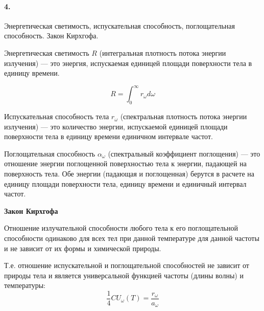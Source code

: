 


	
	\paragraph{4.}
	Энергетическая светимость, испускательная способность, поглощательная способность. Закон Кирхгофа.
	
	\begin{definition}
		Энергетическая светимость $R$ (интегральная плотность потока энергии излучения) — это энергия, испускаемая единицей площади поверхности тела в единицу времени.
		
		$$R = \int_{0}^{\infty} r_\omega d\omega$$
	\end{definition}
	
	\begin{definition}
		Испускательная способность тела $r_\omega$ (спектральная плотность потока энергии излучения) — это количество энергии, испускаемой единицей площади поверхности тела в единицу времени единичном интервале частот.
	\end{definition}
	
	\begin{definition}
		Поглощательная способность $α_ω$  (спектральный коэффициент поглощения) — это отношение энергии поглощенной поверхностью тела к энергии, падающей на поверхность тела. Обе энергии (падающая и поглощенная) берутся в расчете на единицу площади поверхности тела, единицу времени и единичный интервал частот.
	\end{definition}
	
	\textbf{Закон Кирхгофа}
	\begin{statement}
		Отношение излучательной способности любого тела к его поглощательной способности одинаково для всех тел при данной температуре для данной частоты и не зависит от их формы и химической природы.
	\end{statement}

	Т.е. отношение испускательной и поглощательной способностей не зависит от природы тела и является универсальной функцией частоты (длины волны) и температуры:
	$$\frac{1}{4} C U_\omega (T) = \frac{r_\omega}{a_\omega}$$
